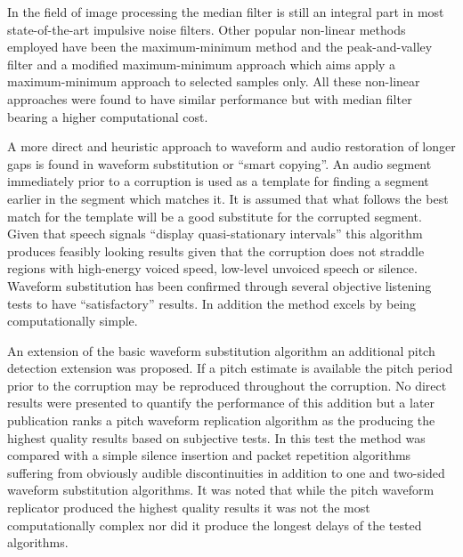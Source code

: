 In the field of image processing the median filter is still an integral part in most state-of-the-art impulsive noise filters\cite{Alajlan2004}. Other popular non-linear methods employed have been the maximum-minimum method\cite{Xu1998} and the peak-and-valley filter\cite{Windyga2001} and a modified maximum-minimum approach\cite{Alajlan2004} which aims apply a maximum-minimum approach to selected samples only. All these non-linear approaches were found to have similar performance but with median filter bearing a higher computational cost\cite{Alajlan2004}.

A more direct and heuristic approach to waveform and audio restoration of longer gaps is found in waveform substitution\cite{Goodman1986} or ``smart copying''\cite{Niediwiecki2001}. An audio segment immediately prior to a corruption is used as a template for finding a segment earlier in the segment which matches it. It is assumed that what follows the best match for the template will be a good substitute for the corrupted segment. Given that speech signals ``display quasi-stationary intervals''\cite{Goodman1986} this algorithm produces feasibly looking results given that the corruption does not straddle regions with high-energy voiced speed, low-level unvoiced speech or silence\cite{Goodman1986}. Waveform substitution has been confirmed through several objective listening tests to have ``satisfactory'' results\cite{Niediwiecki2001}. In addition the method excels by being computationally simple\cite{Niediwiecki2001}.

An extension of the basic waveform substitution algorithm an additional pitch detection extension was proposed. If a pitch estimate is available the pitch period prior to the corruption may be reproduced throughout the corruption\cite{Goodman1986}. No direct results were presented to quantify the performance of this addition but a later publication ranks a pitch waveform replication algorithm as the producing the highest quality results based on subjective tests\cite{Wasem1988}. In this test the method was compared with a simple silence insertion and packet repetition algorithms suffering from obviously audible discontinuities\cite{Goodman1986} in addition to one and two-sided waveform substitution algorithms\cite{Goodman1986}. It was noted that while the pitch waveform replicator produced the highest quality results it was not the most computationally complex nor did it produce the longest delays of the tested algorithms\cite{Wasem1988}.


